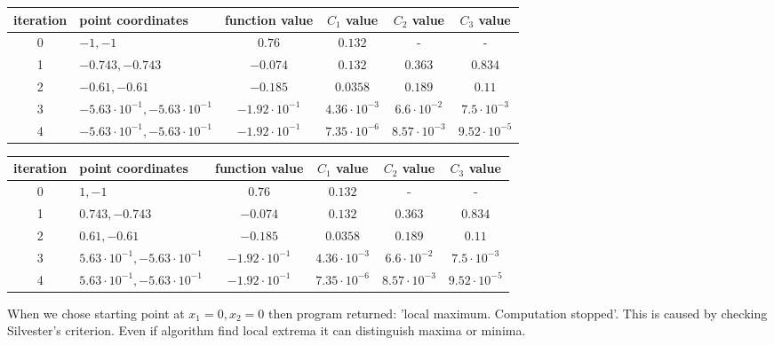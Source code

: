 \documentclass[12pt]{article}
\begin{document}
	\begin{table}[H]
		\begin{tabularx}{\textwidth}{c|X|c|c|c|c|}
			iteration & point coordinates & function value & $C_1$ value & $C_2$ value & $C_3$ value\\
			\hline	
			0 & $-1, -1$ & $0.76$ & $0.132$ & - & - \\
			\hline					
			1 & $-0.743, -0.743$ & $-0.074$ & $0.132$ & $0.363$ & $0.834$ \\ 
			\hline 
			2 & $-0.61, -0.61$ & $-0.185$ & $0.0358$ & $0.189$ & $0.11$ \\ 
			\hline
			3 & $-5.63\cdot10^{-1}, -5.63\cdot10^{-1}$  & $-1.92\cdot10^{-1}$ & $4.36\cdot10^{-3}$ & $6.6\cdot10^{-2}$ & $7.5\cdot10^{-3}$ \\ 
			\hline
			4 & $-5.63\cdot10^{-1}, -5.63\cdot10^{-1}$  & $-1.92\cdot10^{-1}$ &
			$7.35\cdot10^{-6}$ & $8.57\cdot10^{-3}$ & $9.52\cdot10^{-5}$ \\ \hline
		\end{tabularx}		 
	\end{table}
	\begin{table}[H]
		\begin{tabularx}{\textwidth}{c|X|c|c|c|c|}
			iteration & point coordinates & function value & $C_1$ value & $C_2$ value & $C_3$ value\\
			\hline	
			0 & $1, -1$ & $0.76$ & $0.132$ & - & - \\
			\hline					
			1 & $0.743, -0.743$ & $-0.074$ & $0.132$ & $0.363$ & $0.834$ \\ 
			\hline 
			2 & $0.61, -0.61$ & $-0.185$ & $0.0358$ & $0.189$ & $0.11$ \\ 
			\hline
			3 & $5.63\cdot10^{-1}, -5.63\cdot10^{-1}$  & $-1.92\cdot10^{-1}$ & $4.36\cdot10^{-3}$ & $6.6\cdot10^{-2}$ & $7.5\cdot10^{-3}$ \\ 
			\hline
			4 & $5.63\cdot10^{-1}, -5.63\cdot10^{-1}$  & $-1.92\cdot10^{-1}$ &
			$7.35\cdot10^{-6}$ & $8.57\cdot10^{-3}$ & $9.52\cdot10^{-5}$ \\ \hline
		\end{tabularx}		 
	\end{table}
	When we chose starting point at $x_1=0, x_2=0$ then program returned: 'local maximum. Computation stopped'. This is caused by checking Silvester's criterion. Even if algorithm find local extrema it can distinguish maxima or minima. 
	
\end{document}
